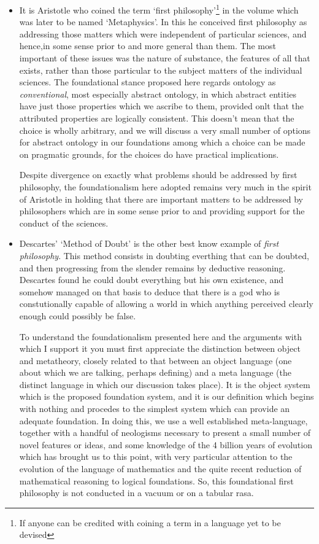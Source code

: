 \begin{itemize}
\item It is Aristotle who coined the term `first philosophy'\footnote{If anyone can be credited with coining a term in a language yet to be devised}%
 in the volume which was later to be named `Metaphysics'.
  In this he conceived first philosophy as addressing those matters which were independent of particular sciences, and hence,in some sense prior to and more general than them.
  The most important of these issues was the nature of substance, the features of all that exists, rather than those particular to the subject matters of the individual sciences.
  The foundational stance proposed here regards ontology as \emph{conventional}, most especially abstract ontology, in which abstract entities have just those properties which we ascribe to them, provided onlt that the attributed properties are logically consistent.
  This doesn't mean that the choice is wholly arbitrary, and we will discuss a very small number of options for abstract ontology in our foundations among which a choice can be made on pragmatic grounds, for the choices do have practical implications.

  Despite divergence on exactly what problems should be addressed by first philosophy, the foundationalism here adopted remains very much in the spirit of Aristotle in holding that there are important matters to be addressed by philosophers which are in some sense prior to and providing support for the conduct of the sciences.
  
\item Descartes' `Method of Doubt' is the other best know example of \emph{first philosophy}.
  This method consists in doubting everthing that can be doubted, and then progressing from the slender remains by deductive reasoning.
  Descartes found he could doubt everything but his own existence, and somehow managed on that basis to deduce that there is a god who is constutionally capable of allowing a world in which anything perceived clearly enough could possibly be false.

  To understand the foundationalism presented here and the arguments with which I support it you must first appreciate the distinction between object and metatheory, closely related to that between an object language (one about which we are talking, perhaps defining) and a meta language (the distinct language in which our discussion takes place).
  It is the object system which is the proposed foundation system, and it is our definition which begins with nothing and procedes to the simplest system which can provide an adequate foundation.
  In doing this, we use a well established meta-language, together with a handful of neologisms necessary to present a small number of novel features or ideas, and some knowledge of the 4 billion years of evolution which has brought us to this point, with very particular attention to the evolution of the language of mathematics and the quite recent reduction of mathematical reasoning to logical foundations.
  So, this foundational first philosophy is not conducted in a vacuum or on a tabular rasa.


\end{itemize}
